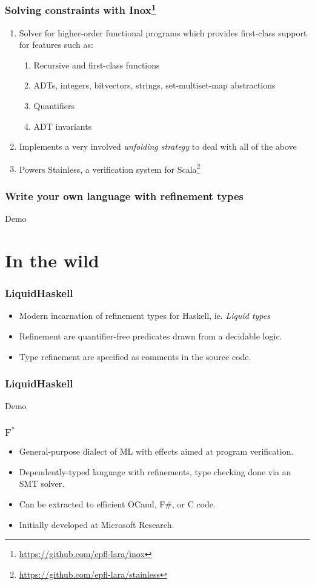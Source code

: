 \documentclass[ignorenonframetext,]{beamer}
\begin{document}
\frame
{
  \frametitle{Solving constraints with Inox\footnote{\url{https://github.com/epfl-lara/inox}}}
  
  \begin{enumerate}
    \item Solver for higher-order functional programs which provides first-class support for features such as:
    
    \begin{enumerate}
    \item Recursive and first-class functions
    \item ADTs, integers, bitvectors, strings, set-multiset-map abstractions
    \item Quantifiers
     \item ADT invariants
     \end{enumerate}
    \item Implements a very involved \textit{unfolding strategy} to deal with all of the above \cite{leon, inox1, inox2}
     \item Powers Stainless, a verification system for Scala\footnote{\url{https://github.com/epfl-lara/stainless}}
  \end{enumerate}
}

\frame
{
  \frametitle{Write your own language with refinement types}
  
  Demo
}

\section{In the wild}

\frame
{
  \frametitle{LiquidHaskell}
  
  \begin{itemize}
    \item Modern incarnation of refinement types for Haskell, ie. \textit{Liquid types} \cite{liquid}
    \item Refinement are quantifier-free predicates drawn from a decidable logic. \cite{liquid}
    \item Type refinement are specified as comments in the source code.
  \end{itemize}
}

\frame
{
  \frametitle{LiquidHaskell}
  
  Demo
}

\frame
{
  \frametitle{$\text{F}^\ast$}
  
  \begin{itemize}
    \item General-purpose dialect of ML with effects aimed at program verification.
    \item Dependently-typed language with refinements, type checking done via an SMT solver.
    \item Can be extracted to efficient OCaml, F#, or C code.
    \item Initially developed at Microsoft Research.
  \end{itemize}
}
\end{document}
